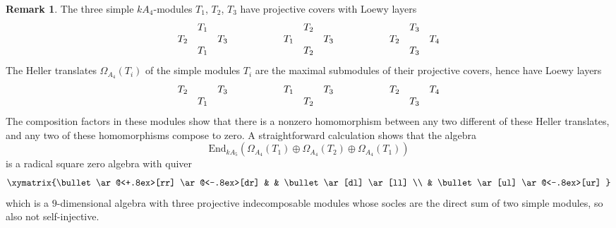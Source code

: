 \documentclass{amsart}
\theoremstyle{plain}\newtheorem{Theorem}{Theorem}[section]
\theoremstyle{plain}\newtheorem{Conjecture}[Theorem]{Conjecture}
\theoremstyle{plain}\newtheorem{Corollary}[Theorem]{Corollary}
\theoremstyle{plain}\newtheorem{Lemma}[Theorem]{Lemma}
\theoremstyle{plain}\newtheorem{Proposition}[Theorem]{Proposition}
\theoremstyle{definition}\newtheorem{Definition}[Theorem]{Definition}
\theoremstyle{definition}\newtheorem{Example}[Theorem]{Example}
\theoremstyle{definition}\newtheorem{Examples}[Theorem]{Examples}
\theoremstyle{definition}\newtheorem{Exercise}[Theorem]{Exercise}
\theoremstyle{definition}\newtheorem{Notation}[Theorem]{Notation}
\theoremstyle{definition}\newtheorem{Remark}[Theorem]{Remark}
\theoremstyle{definition}\newtheorem{Remarks}[Theorem]{Remarks}
\theoremstyle{plain}\newtheorem{Statement}[Theorem]{}
\def\End{\mathrm{End}}
\begin{document}
\begin{Remark}
The three simple $kA_4$-modules $T_1$, $T_2$, $T_3$ have projective
covers with Loewy layers
$$
\begin{matrix} & T_1 & \\ T_2 & & T_3 \\ & T_1 & \end{matrix} \hskip2cm
\begin{matrix} & T_2 & \\ T_1 & & T_3 \\ & T_2 & \end{matrix} \hskip2cm
\begin{matrix} & T_3 & \\ T_2 & & T_4 \\ & T_3 & \end{matrix} 
$$
The Heller translates $\Omega_{A_4}(T_i)$ of the simple modules $T_i$
are the maximal submodules of
their projective covers, hence have Loewy layers
$$
\begin{matrix} T_2 & & T_3 \\ & T_1 & \end{matrix} \hskip2cm
\begin{matrix}  T_1 & & T_3 \\ & T_2 & \end{matrix} \hskip2cm
\begin{matrix}  T_2 & & T_4 \\ & T_3 & \end{matrix} 
$$
The composition factors in these modules show that there is a nonzero
homomorphism between any two different of these Heller translates, and any two of
these homomorphisms compose to zero.
A straightforward calculation shows that
the algebra 
$$\End_{kA_5}(\Omega_{A_4}(T_1)\oplus \Omega_{A_4}(T_2)\oplus 
\Omega_{A_4}(T_1))$$ 
is a radical square zero algebra with quiver
$$\xymatrix{\bullet \ar@<+.8ex>[rr] \ar@<-.8ex>[dr] & & \bullet \ar[dl] \ar[ll] \\
 & \bullet \ar[ul] \ar@<-.8ex>[ur] }$$
 which is a $9$-dimensional algebra with three projective indecomposable
 modules whose socles are the direct sum of two simple modules, so also
 not self-injective.
 

\end{Remark}
\end{document}
